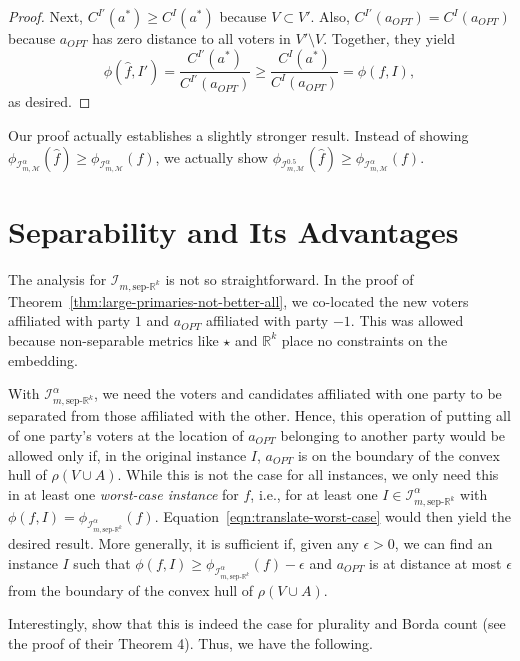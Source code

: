 \documentclass[letterpaper]{article} %
\theoremstyle{definition}
\renewcommand{\hat}{\widehat}
\newcommand{\bbR}{\mathbb{R}}
\newcommand{\calI}{\mathcal{I}}
\newcommand{\calM}{\mathcal{M}}
\newcommand{\pleft}{-1}
\newcommand{\pright}{1}
\newcommand{\all}{\star}
\newcommand{\sep}{\textrm{sep-}}
\newcommand{\euc}[1]{\bbR^{#1}}
\newcommand{\eucsep}[1]{\sep\euc{#1}}
\newcommand{\I}{\calI}
\begin{document}
\begin{proof}
	Next, $C^{I'}(a^*) \ge C^I(a^*)$ because $V \subset V'$. Also, $C^{I'}(a_{OPT}) = C^I(a_{OPT})$ because $a_{OPT}$ has zero distance to all voters in $V' \setminus V$. Together, they yield
	\begin{equation}
	\phi(\hat{f},I') = \frac{C^{I'}(a^*)}{C^{I'}(a_{OPT})} \ge \frac{C^I(a^*)}{C^I(a_{OPT})} = \phi(f,I),
	\label{eqn:translate-worst-case}
	\end{equation}
	as desired.
\end{proof}

Our proof actually establishes a slightly stronger result. Instead of showing $\phi_{\I^{\alpha}_{m,\calM}}(\hat{f}) \ge \phi_{\I^{\alpha}_{m,\calM}}(f)$, we actually show $\phi_{\I^{0.5}_{m,\calM}}(\hat{f}) \ge \phi_{\I^{\alpha}_{m,\calM}}(f)$.

\section{Separability and Its Advantages}
\label{sec:large-primaries-better-line}

The analysis for $\I_{m,\eucsep{k}}$ is not so straightforward. In the proof of Theorem~\ref{thm:large-primaries-not-better-all}, we co-located the new voters affiliated with party $\pright$ and $a_{OPT}$ affiliated with party $\pleft$. This was allowed because non-separable metrics like $\all$ and $\euc{k}$ place no constraints on the embedding.

With $\I^{\alpha}_{m,\eucsep{k}}$, we need the voters and candidates affiliated with one party to be separated from those affiliated with the other. Hence, this operation of putting all of one party's voters at the location of $a_{OPT}$ belonging to another party would be allowed only if, in the original instance $I$, $a_{OPT}$ is on the boundary of the convex hull of $\rho(V \cup A)$. While this is not the case for all instances, we only need this in at least one \emph{worst-case instance} for $f$, i.e., for at least one $I \in \I^{\alpha}_{m,\eucsep{k}}$ with $\phi(f,I) = \phi_{\I^{\alpha}_{m,\eucsep{k}}}(f)$. Equation~\eqref{eqn:translate-worst-case} would then yield the desired result. More generally, it is sufficient if, given any $\epsilon > 0$, we can find an instance $I$ such that $\phi(f,I) \ge \phi_{\I^{\alpha}_{m,\eucsep{k}}}(f) - \epsilon$ and $a_{OPT}$ is at distance at most $\epsilon$ from the boundary of the convex hull of $\rho(V \cup A)$.


Interestingly, \cite{ABP15} show that this is indeed the case for plurality and Borda count (see the proof of their Theorem 4). Thus, we have the following.
\end{document}
